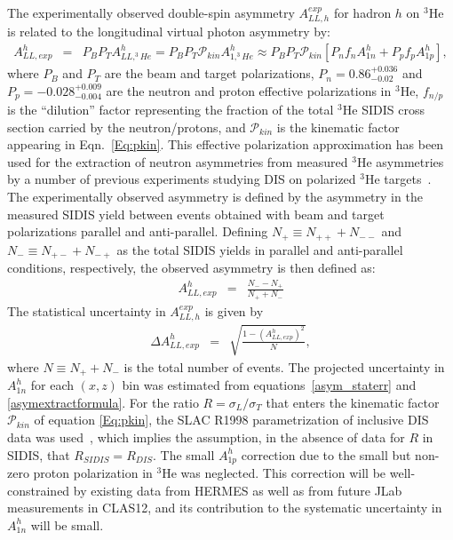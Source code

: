 The experimentally observed double-spin asymmetry $A_{LL,h}^{exp}$ for hadron $h$ on $^3$He is related to the longitudinal virtual photon asymmetry by:
\begin{eqnarray}
  A_{LL,exp}^{h} &=& P_B P_T A_{LL,^3He}^{h} = P_B P_T \mathcal{P}_{kin} A_{1,^3He}^{h} \approx P_B P_T \mathcal{P}_{kin} \left[P_n f_n A_{1n}^h + P_p f_p A_{1p}^h \right], \label{asymextractformula}
\end{eqnarray}
where $P_B$ and $P_T$ are the beam and target polarizations, $P_n = 0.86_{-0.02}^{+0.036}$ and $P_p = -0.028_{-0.004}^{+0.009}$ are the neutron and proton effective polarizations in $^3$He, $f_{n/p}$ is the ``dilution'' factor representing the fraction of the total $^3$He SIDIS cross section carried by the neutron/protons, and $\mathcal{P}_{kin}$ is the kinematic factor appearing in Eqn.~\eqref{Eq:pkin}. This effective polarization approximation has been used for the extraction of neutron asymmetries from measured $^3$He asymmetries by a number of previous experiments studying DIS on polarized $^3$He targets~\cite{E06010_AUT_PRL,E06010_ALT_PRL,A1N_PRL}. The experimentally observed asymmetry is defined by the asymmetry in the measured SIDIS yield between events obtained with beam and target polarizations parallel and anti-parallel. Defining $N_+ \equiv N_{++} + N_{--}$ and $N_{-} \equiv N_{+-} + N_{-+}$ as the total SIDIS yields in parallel and anti-parallel conditions, respectively, the observed asymmetry is then defined as:
\begin{eqnarray}
  A_{LL,exp}^{h} &=& \frac{N_- - N_+}{N_+ + N_-}
\end{eqnarray}
The statistical uncertainty in $A_{LL,h}^{exp}$ is given by 
\begin{eqnarray}
  \Delta A_{LL,exp}^{h} &=& \sqrt{\frac{1-(A_{LL,exp}^{h})^2}{N}}, \label{asym_staterr}
\end{eqnarray}
where $N \equiv N_+ + N_-$ is the total number of events. The projected uncertainty in $A_{1n}^h$ for each $(x,z)$ bin was estimated from equations~\eqref{asym_staterr} and \eqref{asymextractformula}. For the ratio $R = \sigma_L/\sigma_T$ that enters the kinematic factor $\mathcal{P}_{kin}$ of equation \eqref{Eq:pkin}, the SLAC R1998 parametrization of inclusive DIS data was used~\cite{SLAC_R1998}, which implies the assumption, in the absence of data for $R$ in SIDIS, that $R_{SIDIS} = R_{DIS}$. The small $A_{1p}^h$ correction due to the small but non-zero proton polarization in $^3$He was neglected. This correction will be well-constrained by existing data from HERMES as well as from future JLab measurements in CLAS12, and its contribution to the systematic uncertainty in $A_{1n}^h$ will be small.

